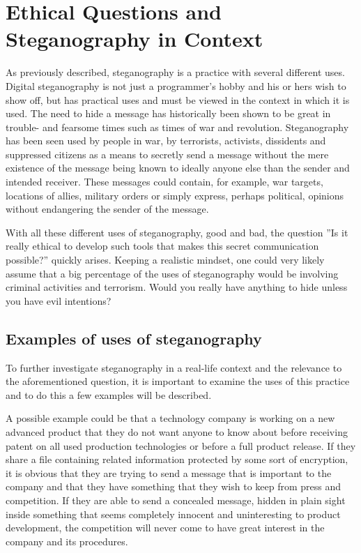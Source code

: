 \section{Ethical Questions and Steganography in Context}
As previously described, steganography is a practice with several different uses.
Digital steganography is not just a programmer's hobby and his or hers wish to show off, but has practical uses and must be viewed in the context in which it is used.
The need to hide a message has historically been shown to be great in trouble- and fearsome times such as times of war and revolution.
Steganography has been seen used by people in war, by terrorists, activists, dissidents and suppressed citizens as a means to secretly send a message without the mere existence of the message being known to ideally anyone else than the sender and intended receiver.
These messages could contain, for example, war targets, locations of allies, military orders or simply express, perhaps political, opinions without endangering the sender of the message.


With all these different uses of steganography, good and bad, the question ''Is it really ethical to develop such tools that makes this secret communication possible?'' quickly arises. Keeping a realistic mindset, one could very likely assume that a big percentage of the uses of steganography would be involving criminal activities and terrorism. Would you really have anything to hide unless you have evil intentions?

\subsection{Examples of uses of steganography}
To further investigate steganography in a real-life context and the relevance to the aforementioned question, it is important to examine the uses of this practice and to do this a few examples will be described.

A possible example could be that a technology company is working on a new advanced product that they do not want anyone to know about before receiving patent on all used production technologies or before a full product release.
If they share a file containing related information protected by some sort of encryption, it is obvious that they are trying to send a message that is important to the company and that they have something that they wish to keep from press and competition.
If they are able to send a concealed message, hidden in plain sight inside something that seems completely innocent and uninteresting to product development, the competition will never come to have great interest in the company and its procedures.


